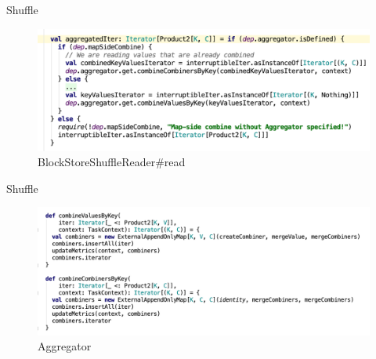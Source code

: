 \begin{frame}[plain,t]{Shuffle} %
	 \\  \vspace{2ex}
	\begin{figure}
		\centering
		\includegraphics[width=1\linewidth]{images/suhfflereader002}
		\caption{BlockStoreShuffleReader\#read}
		\label{fig:suhfflereader002}
	\end{figure}
	
\end{frame}
\begin{frame}[plain,t]{Shuffle} %
	 \\  \vspace{2ex}
	\begin{figure}
		\centering
		\includegraphics[width=1\linewidth]{images/shufflereader004}
		\caption{Aggregator}
		\label{fig:shufflereader004}
	\end{figure}
	
	
\end{frame}



